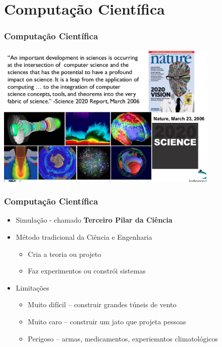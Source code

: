 \documentclass[xcolor={usenames,dvipsnames},12pt,presentation,aspectratio=169]{beamer}
\begin{document}
\section{Computação Científica}
\begin{frame}
  \frametitle{Computação Científica}
  \vspace{-5mm}
  \begin{center}
    \includegraphics[width=0.8\textwidth]{comp.png}
  \end{center}
\end{frame}
\begin{frame}
  \frametitle{Computação Científica}
    \begin{itemize}
      \item Simulação - chamado \textbf{Terceiro Pilar da Ciência}
      \item Método tradicional da Ciência e Engenharia
            \begin{itemize}
                \item Cria a teoria ou projeto
                \item Faz experimentos ou constrói sistemas
            \end{itemize}
        \item Limitações
            \begin{itemize}
                \item Muito difícil -- construir grandes túneis de vento
                \item Muito caro -- construir um jato que projeta pessoas
                \item Perigoso -- armas, medicamentos, experiemntos climatológicos
            \end{itemize}
    \end{itemize}
\end{frame}
\end{document}
